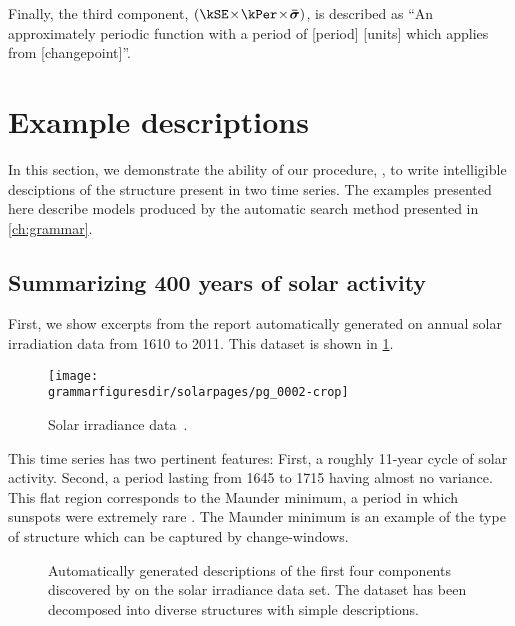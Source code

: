 Finally, the third component, $(\kSE \kerntimes \kPer \kerntimes \boldsymbol{\bar\sigma})$, is described as ``An approximately periodic function with a period of [period] [units] which applies from [changepoint]''.





\section{Example descriptions}
\label{sec:example-descriptions}
In this section, we demonstrate the ability of our procedure, \procedurename, to write intelligible desciptions of the structure present in two time series.
The examples presented here describe models produced by the automatic search method presented in \cref{ch:grammar}.


\subsection{Summarizing 400 years of solar activity}
\label{sec:solar}

First, we show excerpts from the report automatically generated on annual solar irradiation data from 1610 to 2011.
This dataset is shown in \cref{fig:solar}.
%
\begin{figure}[ht!]
\centering
\texttt{[image: \\grammarfiguresdir/solarpages/pg\_0002-crop]}
\caption[Solar irradiance dataset]
{Solar irradiance data~\citep{lean1995reconstruction}.}
\label{fig:solar}
\end{figure}

This time series has two pertinent features: 
First, a roughly 11-year cycle of solar activity.
Second, a period lasting from 1645 to 1715 having almost no variance.
This flat region corresponds to the Maunder minimum, a period in which sunspots were extremely rare \citep{lean1995reconstruction}.
The Maunder minimum is an example of the type of structure which can be captured by change-windows.

\begin{figure}[ht!]
\centering
{}
\caption[Automatically-generated description of the solar irradiance data set]
{Automatically generated descriptions of the first four components discovered by \procedurename{} on the solar irradiance data set.
The dataset has been decomposed into diverse structures with simple descriptions.}
\label{fig:exec}
\end{figure}

